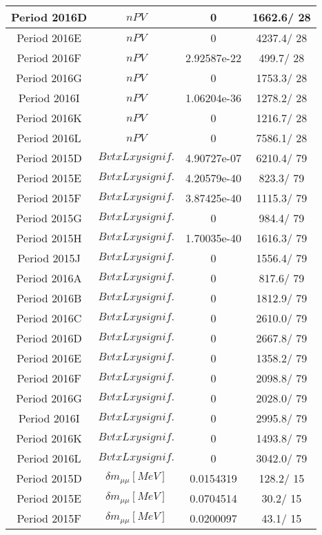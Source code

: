 \documentclass{article}
\begin{document}
\begin{longtable}{c|c|c|c}
\hline
 Period 2016D & $nPV$ & 0 & 1662.6/ 28\\
\hline
 Period 2016E & $nPV$ & 0 & 4237.4/ 28\\
\hline
 Period 2016F & $nPV$ & 2.92587e-22 & 499.7/ 28\\
\hline
 Period 2016G & $nPV$ & 0 & 1753.3/ 28\\
\hline
 Period 2016I & $nPV$ & 1.06204e-36 & 1278.2/ 28\\
\hline
 Period 2016K & $nPV$ & 0 & 1216.7/ 28\\
\hline
 Period 2016L & $nPV$ & 0 & 7586.1/ 28\\
\hline
 Period 2015D & $BvtxLxy signif.$ & 4.90727e-07 & 6210.4/ 79\\
\hline
 Period 2015E & $BvtxLxy signif.$ & 4.20579e-40 & 823.3/ 79\\
\hline
 Period 2015F & $BvtxLxy signif.$ & 3.87425e-40 & 1115.3/ 79\\
\hline
 Period 2015G & $BvtxLxy signif.$ & 0 & 984.4/ 79\\
\hline
 Period 2015H & $BvtxLxy signif.$ & 1.70035e-40 & 1616.3/ 79\\
\hline
 Period 2015J & $BvtxLxy signif.$ & 0 & 1556.4/ 79\\
\hline
 Period 2016A & $BvtxLxy signif.$ & 0 & 817.6/ 79\\
\hline
 Period 2016B & $BvtxLxy signif.$ & 0 & 1812.9/ 79\\
\hline
 Period 2016C & $BvtxLxy signif.$ & 0 & 2610.0/ 79\\
\hline
 Period 2016D & $BvtxLxy signif.$ & 0 & 2667.8/ 79\\
\hline
 Period 2016E & $BvtxLxy signif.$ & 0 & 1358.2/ 79\\
\hline
 Period 2016F & $BvtxLxy signif.$ & 0 & 2098.8/ 79\\
\hline
 Period 2016G & $BvtxLxy signif.$ & 0 & 2028.0/ 79\\
\hline
 Period 2016I & $BvtxLxy signif.$ & 0 & 2995.8/ 79\\
\hline
 Period 2016K & $BvtxLxy signif.$ & 0 & 1493.8/ 79\\
\hline
 Period 2016L & $BvtxLxy signif.$ & 0 & 3042.0/ 79\\
\hline
 Period 2015D & $\delta m_{\mu\mu} [MeV]$ & 0.0154319 & 128.2/ 15\\
\hline
 Period 2015E & $\delta m_{\mu\mu} [MeV]$ & 0.0704514 &  30.2/ 15\\
\hline
 Period 2015F & $\delta m_{\mu\mu} [MeV]$ & 0.0200097 &  43.1/ 15\\

\end{longtable}
\end{document}
